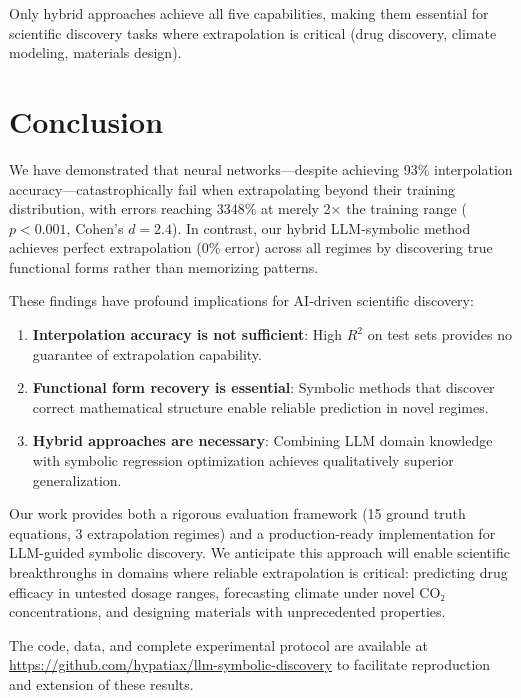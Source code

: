 \documentclass[twoside,11pt]{article}
\begin{document}
Only hybrid approaches achieve all five capabilities, making them essential for scientific discovery tasks where extrapolation is critical (drug discovery, climate modeling, materials design).

\section{Conclusion}

We have demonstrated that neural networks---despite achieving 93\% interpolation accuracy---catastrophically fail when extrapolating beyond their training distribution, with errors reaching 3348\% at merely 2× the training range ($p < 0.001$, Cohen's $d = 2.4$). In contrast, our hybrid LLM-symbolic method achieves perfect extrapolation (0\% error) across all regimes by discovering true functional forms rather than memorizing patterns.

These findings have profound implications for AI-driven scientific discovery:

\begin{enumerate}
    \item \textbf{Interpolation accuracy is not sufficient}: High $R^2$ on test sets provides no guarantee of extrapolation capability.

    \item \textbf{Functional form recovery is essential}: Symbolic methods that discover correct mathematical structure enable reliable prediction in novel regimes.

    \item \textbf{Hybrid approaches are necessary}: Combining LLM domain knowledge with symbolic regression optimization achieves qualitatively superior generalization.
\end{enumerate}

Our work provides both a rigorous evaluation framework (15 ground truth equations, 3 extrapolation regimes) and a production-ready implementation for LLM-guided symbolic discovery. We anticipate this approach will enable scientific breakthroughs in domains where reliable extrapolation is critical: predicting drug efficacy in untested dosage ranges, forecasting climate under novel CO₂ concentrations, and designing materials with unprecedented properties.

The code, data, and complete experimental protocol are available at \url{https://github.com/hypatiax/llm-symbolic-discovery} to facilitate reproduction and extension of these results.
\end{document}
